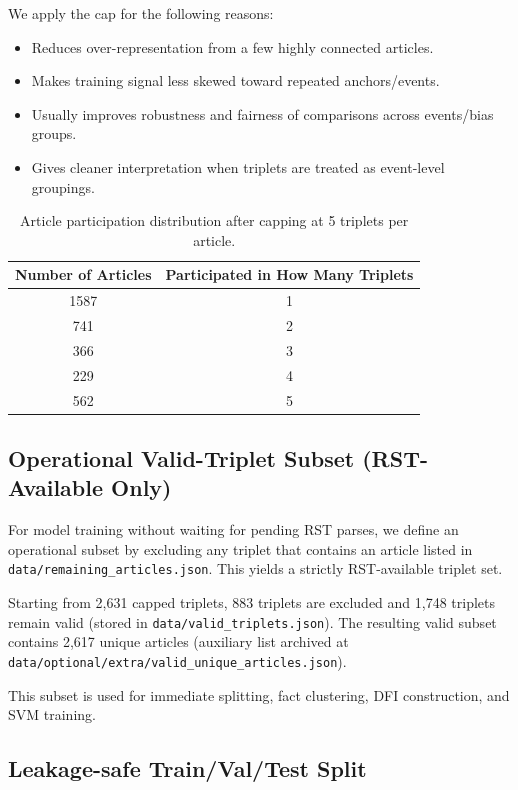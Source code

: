 \documentclass[12pt,a4paper]{article}
\begin{document}
We apply the cap for the following reasons:
\begin{itemize}
\item Reduces over-representation from a few highly connected articles.
\item Makes training signal less skewed toward repeated anchors/events.
\item Usually improves robustness and fairness of comparisons across events/bias groups.
\item Gives cleaner interpretation when triplets are treated as event-level groupings.
\end{itemize}

\begin{table}[h]
\centering
\begin{tabular}{cc}
\hline
\textbf{Number of Articles} & \textbf{Participated in How Many Triplets} \\
\hline
1587 & 1 \\
741 & 2 \\
366 & 3 \\
229 & 4 \\
562 & 5 \\
\hline
\end{tabular}
\caption{Article participation distribution after capping at 5 triplets per article.}
\label{tab:capped_triplet_participation}
\end{table}

\subsection{Operational Valid-Triplet Subset (RST-Available Only)}

For model training without waiting for pending RST parses, we define an operational subset by excluding any triplet
that contains an article listed in \texttt{data/remaining\_articles.json}.
This yields a strictly RST-available triplet set.

Starting from 2,631 capped triplets, 883 triplets are excluded and 1,748 triplets remain valid
(stored in \texttt{data/valid\_triplets.json}).
The resulting valid subset contains 2,617 unique articles
(auxiliary list archived at \texttt{data/optional/extra/valid\_unique\_articles.json}).

This subset is used for immediate splitting, fact clustering, DFI construction, and SVM training.

\subsection{Leakage-safe Train/Val/Test Split}
\end{document}
